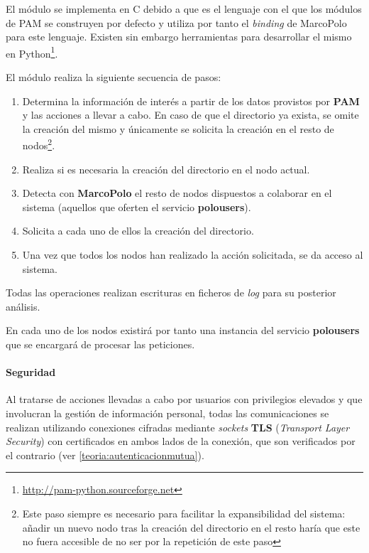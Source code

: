 El módulo se implementa en C debido a que es el lenguaje con el que los módulos de PAM se construyen por defecto y utiliza por tanto el \textit{binding} de MarcoPolo para este lenguaje. Existen sin embargo herramientas para desarrollar el mismo en Python\footnote{\href{http://pam-python.sourceforge.net/}{http://pam-python.sourceforge.net}}.

El módulo realiza la siguiente secuencia de pasos:

\begin{enumerate}
	\item Determina la información de interés a partir de los datos provistos por \textbf{PAM} y las acciones a llevar a cabo. En caso de que el directorio ya exista, se omite la creación del mismo y únicamente se solicita la creación en el resto de nodos\footnote{Este paso siempre es necesario para facilitar la expansibilidad del sistema: añadir un nuevo nodo tras la creación del directorio en el resto haría que este no fuera accesible de no ser por la repetición de este paso}.
	
	\item Realiza si es necesaria la creación del directorio en el nodo actual.
	
	\item Detecta con \textbf{MarcoPolo} el resto de nodos dispuestos a colaborar en el sistema (aquellos que oferten el servicio \textbf{polousers}).
	
	\item Solicita a cada uno de ellos la creación del directorio.
	
	\item Una vez que todos los nodos han realizado la acción solicitada, se da acceso al sistema.
\end{enumerate}

Todas las operaciones realizan escrituras en ficheros de \textit{log} para su posterior análisis.

En cada uno de los nodos existirá por tanto una instancia del servicio \textbf{polousers} que se encargará de procesar las peticiones.

\paragraph{Seguridad\\}

Al tratarse de acciones llevadas a cabo por usuarios con privilegios elevados y que involucran la gestión de información personal, todas las comunicaciones se realizan utilizando conexiones cifradas mediante \textit{sockets} \textbf{TLS} (\textit{Transport Layer Security}) con certificados en ambos lados de la conexión, que son verificados por el contrario (ver \ref{teoria:autenticacionmutua}).

